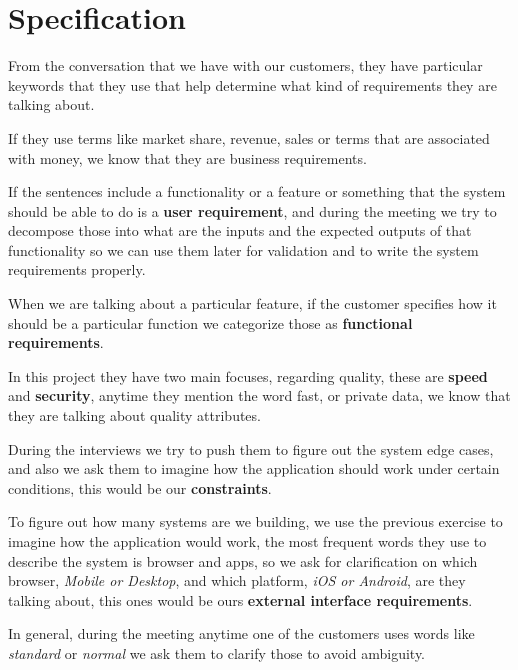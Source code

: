 \section{Specification}
From the conversation that we have with our customers, they have particular 
keywords that they use that help determine what kind of requirements they 
are talking about. \newline

\noindent If they use terms like market share, revenue, sales or terms that 
are associated with money, we know that they are business requirements. \newline

\noindent If the sentences include a functionality or a feature or something 
that the system should be able to do is a \textbf{user requirement}, and during 
the meeting we try to decompose those into what are the inputs and the expected 
outputs of that functionality so we can use them later for validation and to 
write the system requirements properly. \newline

\noindent When we are talking about a particular feature, if the customer 
specifies how it should be a particular function we categorize those as 
\textbf{functional requirements}. \newline

\noindent In this project they have two main focuses, regarding quality, these are 
\textbf{speed} and \textbf{security}, anytime they mention the word fast, or 
private data, we know that they are talking about quality attributes. \newline

\noindent During the interviews we try to push them to figure out the system 
edge cases, and also we ask them to imagine how the application should work 
under certain conditions, this would be our \textbf{constraints}. \newline

\noindent To figure out how many systems are we building, we use the previous 
exercise to imagine how the application would work, the most frequent words 
they use to describe the system is browser and apps, so we ask for 
clarification on which browser, \textit{Mobile or Desktop}, and which 
platform, \textit{iOS or Android}, are they talking about, this ones would be ours 
\textbf{external interface requirements}. \newline

\noindent In general, during the meeting anytime one of the customers uses 
words like \textit{standard} or \textit{normal} we ask them to clarify those 
to avoid ambiguity. \newline

